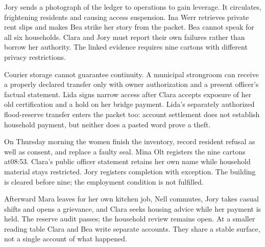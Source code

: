 Jory sends a photograph of the ledger to operations to gain leverage. It circulates, frightening residents and causing access suspension. Ina Werr retrieves private rent slips and makes Bea strike her story from the packet. Bea cannot speak for all six households. Clara and Jory must report their own failures rather than borrow her authority. The linked evidence requires nine cartons with different privacy restrictions.

Courier storage cannot guarantee continuity. A municipal strongroom can receive a properly declared transfer only with owner authorization and a present officer's factual statement. Lida signs narrow access after Clara accepts exposure of her old certification and a hold on her bridge payment. Lida's separately authorized flood-reserve transfer enters the packet too: account settlement does not establish household payment, but neither does a pasted word prove a theft.

On Thursday morning the women finish the inventory, record resident refusal as well as consent, and replace a faulty seal. Mina Olt registers the nine cartons at08:53. Clara's public officer statement retains her own name while household material stays restricted. Jory registers completion with exception. The building is cleared before nine; the employment condition is not fulfilled.

Afterward Mara leaves for her own kitchen job, Nell commutes, Jory takes casual shifts and opens a grievance, and Clara seeks housing advice while her payment is held. The reserve audit passes; the household review remains open. At a smaller reading table Clara and Bea write separate accounts. They share a stable surface, not a single account of what happened.
